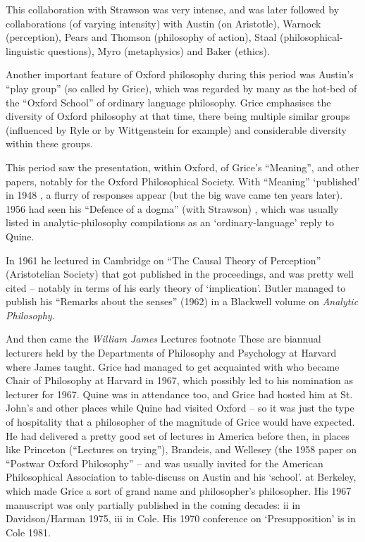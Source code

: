 \documentclass[10pt,titlepage]{book}
\begin{document}
This collaboration with Strawson was very intense, and was later followed by collaborations (of varying intensity) with Austin (on Aristotle), Warnock (perception), Pears and Thomson (philosophy of action), Staal (philosophical-linguistic questions), Myro (metaphysics) and Baker (ethics).

Another important feature of Oxford philosophy during this period was Austin's ``play group'' (so called by Grice), which was regarded by many as the hot-bed of the ``Oxford School'' of ordinary language philosophy.
Grice emphasises the diversity of Oxford philosophy at that time, there being multiple similar groups (influenced by Ryle or by Wittgenstein for example) and considerable diversity within these groups.  

This period saw the presentation, within Oxford, of Grice's ``Meaning'', and other papers, notably for the Oxford Philosophical Society.
With ``Meaning'' `published' in 1948 \cite{Grice48}, a flurry of responses appear (but the big wave came ten years later).
1956 had seen his ``Defence of a dogma'' (with Strawson) \cite{grice56}, which was usually listed in analytic-philosophy compilations as an `ordinary-language' reply to Quine.

In 1961 he lectured in Cambridge on ``The Causal Theory of Perception'' (Aristotelian Society) that got published in the proceedings, and was pretty well cited -- notably in terms of his early theory of `implication'.
Butler managed to publish  his ``Remarks about the senses'' (1962) in a Blackwell volume on \emph{Analytic  Philosophy}.

And then came the \emph{William James} Lectures%
footnote{
These are biannual lecturers held by the Departments of Philosophy  and 
Psychology at Harvard where James taught. Grice had managed to get  acquainted 
with who became Chair of Philosophy at Harvard in 1967, which  possibly led 
to his nomination as lecturer for 1967.
Quine was in attendance too, and Grice had hosted him at St. John's and other places while Quine had visited Oxford -- so it was just the type of hospitality that a philosopher of the magnitude of Grice would have expected.
He had delivered a pretty good set of lectures in America before then, in places like Princeton (``Lectures on  
trying''), Brandeis, and Wellesey (the 1958 paper on ``Postwar Oxford Philosophy''  -- and was usually invited for the American Philosophical Association to table-discuss on Austin and his `school'.
}
at Berkeley, which made Grice a sort of grand name and philosopher's philosopher.
His 1967 manuscript was only partially published in the coming decades: ii in Davidson/Harman 1975, iii in  Cole.
His 1970 conference on `Presupposition' is in Cole 1981.
\end{document}
